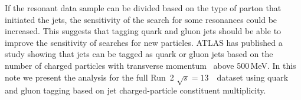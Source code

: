 If the resonant data sample can be divided based on the type of
parton that initiated the jets, the sensitivity of the search for some
resonances could be increased. 
This suggests that tagging quark and gluon jets should be able to
improve the sensitivity of searches for new particles.
ATLAS has published a study \cite{ATL-PHYS-PUB-2017-009} showing that
jets can be tagged as quark or gluon jets based on the number of
charged particles with transverse momentum \pt\ above 500\,MeV.  
In this note we present the analysis for the full Run~2 
$\sqrt{s} = 13$~\TeV\ dataset using quark and gluon tagging
based on jet charged-particle constituent multiplicity. 







